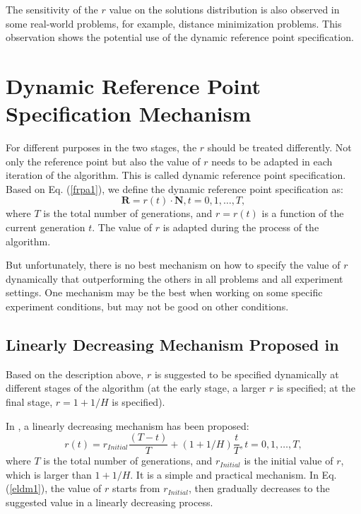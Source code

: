 \documentclass[conference]{IEEEtran}
\begin{document}
The sensitivity of the $r$ value on the solutions distribution is also observed in some real-world problems,
for example, distance minimization problems. 
This observation shows the potential use of the dynamic reference point specification\cite{hisao:dynamic}.

\section{Dynamic Reference Point Specification Mechanism}
For different purposes in the two stages, the $r$ should be treated differently\cite{hisao:dynamic}. 
Not only the reference point but also the value of $r$ 
needs to be adapted in each iteration of the algorithm. 
This is called dynamic reference point specification. 
Based on Eq. (\ref{frpa1}), 
we define the dynamic reference point specification as:
\begin{equation}\label{f2}
  \boldsymbol R = r(t) \cdot \boldsymbol N, 
  t=0,1,\dots,T,
\end{equation}
where $T$ is the total number of generations, and $r=r(t)$ is a function of the current generation $t$.
The value of $r$ is adapted during the process of the algorithm. 

But unfortunately, there is no best mechanism on how to specify the value of $r$ dynamically
that outperforming the others in all problems and all experiment settings. One mechanism may be the best
when working on some specific experiment conditions, but may not be good on other conditions. 

% 
\subsection{Linearly Decreasing Mechanism Proposed in \cite{hisao:dynamic}} 
Based on the description above, $r$ is suggested to be specified dynamically at different stages of
the algorithm (at the early stage, a larger $r$ is specified; at the final stage, $r=1+1/H$ is specified).

In \cite{hisao:dynamic}, a linearly decreasing mechanism has been proposed:
\begin{equation}\label{eldm1}
  r(t)=r_{Initial}\frac{(T-t)}{T}+(1+1/H)\frac{t}{T}, t=0,1,\dots,T,
\end{equation}
where $T$ is the total number of generations, and $r_{Initial}$ is the initial value of $r$,
which is larger than $1+1/H$. 
It is a simple and practical mechanism. In Eq. (\ref{eldm1}), the value of $r$ starts from $r_{Initial}$,
then gradually decreases to the suggested value in a linearly decreasing process. 
\end{document}
